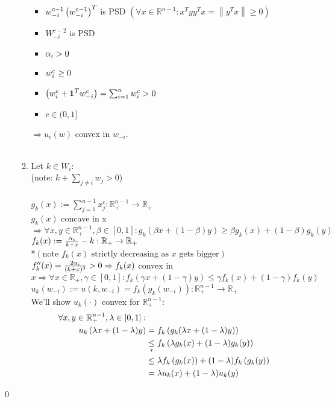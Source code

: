 \documentclass[11pt]{article}
\theoremstyle{definition}
\theoremstyle{definition}
\begin{document}
\begin{enumerate}
\begin{enumerate}
			\begin{itemize}
				\item
					$w_{-i}^{c-1} \left( w_{-i}^{c-1} \right)^T$ is PSD $\left( \forall x \in \mathbb{R}^{n-1}: x^T y y^T x = \left\lVert y^T x \right\rVert \geq 0 \right)$
				\item
					$W_{-i}^{c-2}$ is PSD
				\item
					$\alpha_i > 0$
				\item
					$w_i^c \geq 0$
				\item
					$\left( w_i^c + \textbf{1}^Tw_{-i}^c \right) = \sum_{i=1}^n w_i^c > 0$
				\item
					$c\in (0,1]$
			\end{itemize}
			$\Rightarrow u_i(w)$ convex in $w_{-i}$.\\\\


	\item
		Let $k\in W_i$:\\
		(note: $k+\sum_{j \neq i} w_j > 0$)\\\\
		$g_k(x) := \sum_{j=1}^{n-1} x_j^c : \mathbb{R}_+^{n-1} \rightarrow \mathbb{R}_+$\\
		$g_k(x)$ concave in x $\Rightarrow \forall x,y \in \mathbb{R}_+^{n-1}, \beta \in [0,1] : g_k \left( \beta x + (1-\beta)y \right) \geq \beta g_k(x) + (1-\beta)g_k(y)$\\


		$f_k(x) := \frac{\alpha_i}{k + x} - k : \mathbb{R}_+ \rightarrow \mathbb{R}_+$\\
		*$\left( \text{note $f_k(x)$ strictly decreasing as $x$ gets bigger} \right)$ \\
		$f_k''(x) = \frac{2\alpha_i}{(k+x)^3} > 0 \Rightarrow f_k(x)$ convex in $x \Rightarrow \forall x \in \mathbb{R}_+, \gamma \in [0,1] : f_k \left( \gamma x + (1-\gamma)y \right) \leq \gamma f_k(x) + (1-\gamma) f_k(y)$\\


		$u_k (w_{-i}) := u(k,w_{-i}) = f_k(g_k(w_{-i})) : \mathbb{R}_+^{n-1} \rightarrow \mathbb{R}_+$\\
		We'll show $u_k(\cdot)$ convex for $\mathbb{R}_+^{n-1}$:
		\begin{align*}
			\forall x,y \in \mathbb{R}_+^{n-1}, \lambda \in [0,1] :\\
			u_k\left(\lambda x + (1-\lambda) y \right) & = f_k \left( g_k(\lambda x + (1-\lambda) y) \right)\\
															   & \underset{*}{\leq} f_k \left( \lambda g_k(x) + (1-\lambda) g_k(y) \right)\\
															   & \leq \lambda f_k \left( g_k(x) \right) + (1-\lambda) f_k \left( g_k(y) \right)\\
															   & = \lambda u_k(x) + (1-\lambda) u_k(y)
		\end{align*}

	\end{enumerate}
\end{enumerate}
\qed
\end{document}
